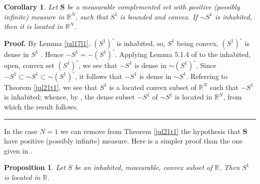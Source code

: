 \documentclass[11pt]{article}%
\newtheorem{corollary}[theorem]{Corollary}
\newtheorem{proposition}[theorem]{Proposition}
\newenvironment{proof}[1][Proof]{\noindent\textbf{#1.} }{\ \rule{0.5em}{0.5em}}
\begin{document}
\begin{corollary}
\label{jul17c1}Let $\mathbf{S}$ be a measurable complemented set with positive
(possibly infinite) measure in $\mathbb{R}^{N}$, such that $S^{1}$ is bounded
and convex. If $%
\mathord{\sim}%
S^{1}$ is inhabited, then it is located in $\mathbb{R}^{N}$.
\end{corollary}

\begin{proof}
By Lemma \ref{jul17l1}, $\left(  S^{1}\right)  ^{\circ}$ is inhabited, so,
$S^{1}$ being convex, $\left(  S^{1}\right)  ^{\circ}$ is dense in $S^{1}$
\cite[Propn 10]{dsb26}. Hence $-S^{1}=-\left(  S^{1}\right)  ^{\circ}$.
Applying Lemma 5.1.4 of \cite{BVtech} to the inhabited, open, convex set
$\left(  S^{1}\right)  ^{\circ}$, we see that $-S^{1}$ is dense in $%
\mathord{\sim}%
\left(  S^{1}\right)  ^{\circ}$. Since $-S^{1}\subset%
\mathord{\sim}%
S^{1}\subset%
\mathord{\sim}%
\left(  S^{1}\right)  ^{\circ}$, it follows that $-S^{1}$ is dense in $%
\mathord{\sim}%
S^{1}$. Referring to Theorem \ref{jul21t1}, we see that $S^{1}$ is a located
convex subset of $\mathbb{R}^{N}$ such that $-S^{1}$ is inhabited; whence, by
\cite[4.1.15]{BVtech}, the dense subset $-S^{1}$ of $%
\mathord{\sim}%
S^{1}$ is located in $\mathbb{R}^{N}$, from which the result follows.
\end{proof}

%

\medskip


\label{2207}In the case $N=1$ we can remove from Theorem \ref{jul21t1} the
hypothesis that $\mathbf{S}$ have positive (possibly infinite) measure. Here
is a simpler proof than the one given in \cite[Thm. 3]{Br88}.

\begin{proposition}
\label{jul21p1}Let $S$ be an inhabited, measurable, convex subset of
$\mathbb{R}$. Then $S^{1}$ is located in $\mathbb{R}$.
\end{proposition}
\end{document}
